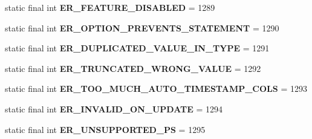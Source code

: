 \begin{DoxyCompactItemize}
\mbox{\label{classcom_1_1mysql_1_1jdbc_1_1_mysql_error_numbers_a61607dcf2b1915b5f6dc27046a0d9b1c}} 
static final int {\bfseries E\+R\+\_\+\+F\+E\+A\+T\+U\+R\+E\+\_\+\+D\+I\+S\+A\+B\+L\+ED} = 1289
\item 
\mbox{\label{classcom_1_1mysql_1_1jdbc_1_1_mysql_error_numbers_a00fbeb862fbfba586f70cd311deb50cd}} 
static final int {\bfseries E\+R\+\_\+\+O\+P\+T\+I\+O\+N\+\_\+\+P\+R\+E\+V\+E\+N\+T\+S\+\_\+\+S\+T\+A\+T\+E\+M\+E\+NT} = 1290
\item 
\mbox{\label{classcom_1_1mysql_1_1jdbc_1_1_mysql_error_numbers_af3b607b9df0fadc6a1dbae665f1d21e4}} 
static final int {\bfseries E\+R\+\_\+\+D\+U\+P\+L\+I\+C\+A\+T\+E\+D\+\_\+\+V\+A\+L\+U\+E\+\_\+\+I\+N\+\_\+\+T\+Y\+PE} = 1291
\item 
\mbox{\label{classcom_1_1mysql_1_1jdbc_1_1_mysql_error_numbers_aa96598986e59fce965b3d21a2a9027ae}} 
static final int {\bfseries E\+R\+\_\+\+T\+R\+U\+N\+C\+A\+T\+E\+D\+\_\+\+W\+R\+O\+N\+G\+\_\+\+V\+A\+L\+UE} = 1292
\item 
\mbox{\label{classcom_1_1mysql_1_1jdbc_1_1_mysql_error_numbers_aecb843ca92885f114f1d275b8dfa68bd}} 
static final int {\bfseries E\+R\+\_\+\+T\+O\+O\+\_\+\+M\+U\+C\+H\+\_\+\+A\+U\+T\+O\+\_\+\+T\+I\+M\+E\+S\+T\+A\+M\+P\+\_\+\+C\+O\+LS} = 1293
\item 
\mbox{\label{classcom_1_1mysql_1_1jdbc_1_1_mysql_error_numbers_a710d52cc054025a9d40f1faa470d0c3b}} 
static final int {\bfseries E\+R\+\_\+\+I\+N\+V\+A\+L\+I\+D\+\_\+\+O\+N\+\_\+\+U\+P\+D\+A\+TE} = 1294
\item 
\mbox{\label{classcom_1_1mysql_1_1jdbc_1_1_mysql_error_numbers_ab231bdfa0c32e4483d2d03a291e67c23}} 
static final int {\bfseries E\+R\+\_\+\+U\+N\+S\+U\+P\+P\+O\+R\+T\+E\+D\+\_\+\+PS} = 1295
\item 
\mbox{\label{classcom_1_1mysql_1_1jdbc_1_1_mysql_error_numbers_ac05234b6ec3c76d086d8a6f2234f003b}} 

\end{DoxyCompactItemize}
